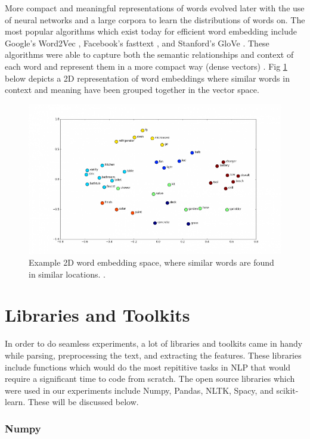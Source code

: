 More compact and meaningful representations of words evolved later with the use of neural networks and a large corpora to learn the distributions of words on. The most popular algorithms which exist today for efficient word embedding include Google's Word2Vec \cite{word2vec}, Facebook's fasttext \cite{fasttext}, and Stanford's GloVe \cite{glove}. These algorithms were able to capture both the semantic relationships and context of each word and represent them in a more compact way (dense vectors) \cite{shane_wordembedding}. Fig \ref{simple_embedding} below depicts a 2D representation of word embeddings where similar words in context and meaning have been grouped together in the vector space. 

\begin{figure}[h!]
	\centering
	\includegraphics[scale=0.5]{images/2d_word_embedding}
	\caption{Example 2D word embedding space, where similar words are found in similar locations. \cite{2d_embedding}.}
	\label{simple_embedding}
\end{figure}

\section{Libraries and Toolkits}

In order to do seamless experiments, a lot of libraries and toolkits came in handy while parsing, preprocessing the text, and extracting the features. These libraries include functions which would do the most repititive tasks in NLP that would require a significant time to code from scratch. The open source libraries which were used in our experiments include Numpy, Pandas, NLTK, Spacy, and scikit-learn. These will be discussed below.

\subsubsection{Numpy}

